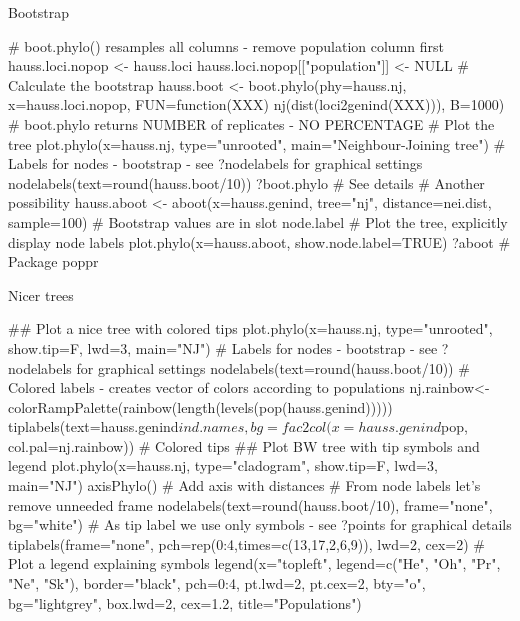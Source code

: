 \documentclass[compress, ucs, xelatex, 11pt, xcolor=svgnames,
  hyperref={
    bookmarks=true,
    unicode=true,
    colorlinks=true,
    pdftitle={Molecular data in R},
    plainpages=false,
    pdfauthor={Vojtech Zeisek},
    pdfsubject={Course about phylogeny and evolution in R},
    pdfcreator={XeLaTeX},
    pdfkeywords={R, evolution, phylogeny, molecular data},
    linkcolor=Tomato,
    anchorcolor=SaddleBrown,
    citecolor=Goldenrod,
    filecolor=DarkMagenta,
    menucolor=Sienna,
    urlcolor=DarkTurquoise,
    pdftex},
  url={hyphens, lowtilde} %
  ]{beamer}
\begin{document}
\begin{frame}[fragile]{Bootstrap}
  \begin{spluscode}
    # boot.phylo() resamples all columns - remove population column first
    hauss.loci.nopop <- hauss.loci
    hauss.loci.nopop[["population"]] <- NULL
    # Calculate the bootstrap
    hauss.boot <- boot.phylo(phy=hauss.nj, x=hauss.loci.nopop,
      FUN=function(XXX) nj(dist(loci2genind(XXX))), B=1000)
    # boot.phylo returns NUMBER of replicates - NO PERCENTAGE
    # Plot the tree
    plot.phylo(x=hauss.nj, type="unrooted", main="Neighbour-Joining tree")
    # Labels for nodes - bootstrap - see ?nodelabels for graphical settings
    nodelabels(text=round(hauss.boot/10))
    ?boot.phylo # See details
    # Another possibility
    hauss.aboot <- aboot(x=hauss.genind, tree="nj", distance=nei.dist,
      sample=100) # Bootstrap values are in slot node.label
    # Plot the tree, explicitly display node labels
    plot.phylo(x=hauss.aboot, show.node.label=TRUE)
    ?aboot # Package poppr
  \end{spluscode}
\end{frame}

\begin{frame}[fragile]{Nicer trees}
  \begin{footnotesize}
  \begin{spluscode}
    ## Plot a nice tree with colored tips
    plot.phylo(x=hauss.nj, type="unrooted", show.tip=F, lwd=3, main="NJ")
    # Labels for nodes - bootstrap - see ?nodelabels for graphical settings
    nodelabels(text=round(hauss.boot/10))
    # Colored labels - creates vector of colors according to populations
    nj.rainbow<-colorRampPalette(rainbow(length(levels(pop(hauss.genind)))))
    tiplabels(text=hauss.genind$ind.names, bg=fac2col(x=hauss.genind$pop,
      col.pal=nj.rainbow)) # Colored tips
    ## Plot BW tree with tip symbols and legend
    plot.phylo(x=hauss.nj, type="cladogram", show.tip=F, lwd=3, main="NJ")
    axisPhylo() # Add axis with distances
    # From node labels let's remove unneeded frame
    nodelabels(text=round(hauss.boot/10), frame="none", bg="white")
    # As tip label we use only symbols - see ?points for graphical details
    tiplabels(frame="none", pch=rep(0:4,times=c(13,17,2,6,9)), lwd=2, cex=2)
    # Plot a legend explaining symbols
    legend(x="topleft", legend=c("He", "Oh", "Pr", "Ne", "Sk"), 
      border="black", pch=0:4, pt.lwd=2, pt.cex=2, bty="o", bg="lightgrey",
      box.lwd=2, cex=1.2, title="Populations")
  \end{spluscode}
  \end{footnotesize}
\end{frame}
\end{document}
